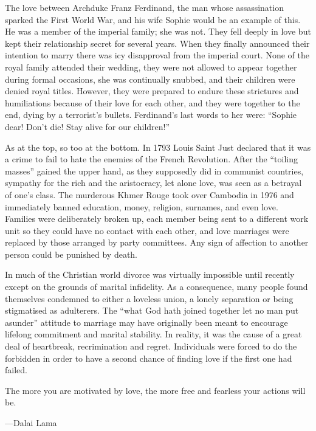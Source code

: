 \documentclass[10pt, openright]{book}
\newenvironment{epigram-2}%
{%
\setstretch{1.4}
\vspace{1em}
\noindent
\quoting[leftmargin=2cm,rightmargin=2cm]%
\begin{itshape}
\large
}%
{\end{itshape}\endquoting
}%
\newenvironment{epigram-2-cite}%
{%
\quoting[leftmargin=2cm,rightmargin=2cm]%
\noindent\normal\hspace*{\fill} 
}%
{\endquoting
}%
\begin{document}
The love between Archduke Franz Ferdinand, the man whose assassination sparked the First World War, and his wife Sophie would be an example of this. He was a member of the imperial family; she was not. They fell deeply in love but kept their relationship secret for several years. When they finally announced their intention to marry there was icy disapproval from the imperial court. None of the royal family attended their wedding, they were not allowed to appear together during formal occasions, she was continually snubbed, and their children were denied royal titles. However, they were prepared to endure these strictures and humiliations because of their love for each other, and they were together to the end, dying by a terrorist’s bullets. Ferdinand’s last words to her were: “Sophie dear! Don’t die! Stay alive for our children!”


As at the top, so too at the bottom. In 1793 Louis Saint Just declared that it was a crime to fail to hate the enemies of the French Revolution. After the “toiling masses” gained the upper hand, as they supposedly did in communist countries, sympathy for the rich and the aristocracy, let alone love, was seen as a betrayal of one’s class. The murderous Khmer Rouge took over Cambodia in 1976 and immediately banned education, money, religion, surnames, and even love. Families were deliberately broken up, each member being sent to a different work unit so they could have no contact with each other, and love marriages were replaced by those arranged by party committees. Any sign of affection to another person could be punished by death.


In much of the Christian world divorce was virtually impossible until recently except on the grounds of marital infidelity. As a consequence, many people found themselves condemned to either a loveless union, a lonely separation or being stigmatised as adulterers. The “what God hath joined together let no man put asunder” attitude to marriage may have originally been meant to encourage lifelong commitment and marital stability. In reality, it was the cause of a great deal of heartbreak, recrimination and regret. Individuals were forced to do the forbidden in order to have a second chance of finding love if the first one had failed.


\begin{epigram-2}
The more you are motivated by love, the more free and fearless your actions will be.
\end{epigram-2}
\begin{epigram-2-cite}
—Dalai Lama
\end{epigram-2-cite}
\end{document}
